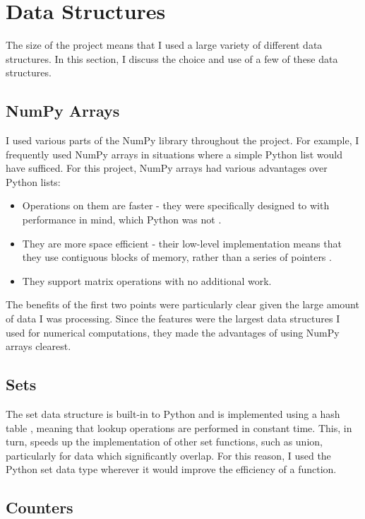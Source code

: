 \documentclass[12pt,a4paper,twoside,openright]{report}
\begin{document}
\section{Data Structures} \label{impl-structures}

The size of the project means that I used a large variety of different data structures. In this section, I discuss the choice and use of a few of these data structures.

\subsection{NumPy Arrays}

I used various parts of the NumPy library throughout the project. For example, I frequently used NumPy arrays in situations where a simple Python list would have sufficed. For this project, NumPy arrays had various advantages over Python lists:
\begin{itemize}
	\item Operations on them are faster - they were specifically designed to with performance in mind, which Python was not \cite{numpyspeed}.
	\item They are more space efficient - their low-level implementation means that they use contiguous blocks of memory, rather than a series of pointers \cite{numpymanual}.
	\item They support matrix operations with no additional work.
\end{itemize}
\vspace{5pt}
The benefits of the first two points were particularly clear given the large amount of data I was processing. Since the features were the largest data structures I used for numerical computations, they made the advantages of using NumPy arrays clearest.

\subsection{Sets}

The set data structure is built-in to Python and is implemented using a hash table \cite{pythonsetdocs}, meaning that lookup operations are performed in constant time. This, in turn, speeds up the implementation of other set functions, such as union, particularly for data which significantly overlap. For this reason, I used the Python set data type wherever it would improve the efficiency of a function.

\subsection{Counters} 
\end{document}
